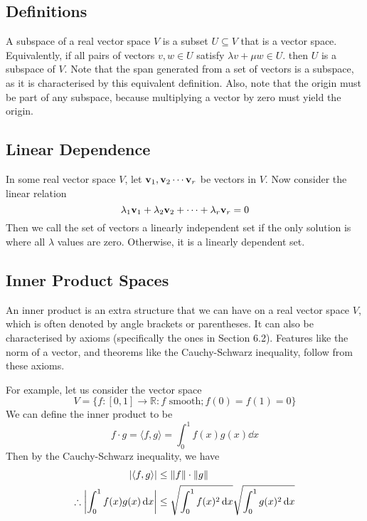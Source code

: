 \subsection{Definitions}
A subspace of a real vector space $V$ is a subset $U \subseteq V$ that is a vector space. Equivalently, if all pairs of vectors $v, w \in U$ satisfy $\lambda v + \mu w \in U$. then $U$ is a subspace of $V$. Note that the span generated from a set of vectors is a subspace, as it is characterised by this equivalent definition. Also, note that the origin must be part of any subspace, because multiplying a vector by zero must yield the origin.

\subsection{Linear Dependence}
In some real vector space $V$, let $\vb v_1, \vb v_2 \cdots \vb v_r$ be vectors in $V$. Now consider the linear relation
\[ \lambda_1 \vb v_1 + \lambda_2 \vb v_2 + \cdots + \lambda_r \vb v_r = 0 \]
Then we call the set of vectors a linearly independent set if the only solution is where all $\lambda$ values are zero. Otherwise, it is a linearly dependent set.

\subsection{Inner Product Spaces}
An inner product is an extra structure that we can have on a real vector space $V$, which is often denoted by angle brackets or parentheses. It can also be characterised by axioms (specifically the ones in Section 6.2). Features like the norm of a vector, and theorems like the Cauchy-Schwarz inequality, follow from these axioms.

For example, let us consider the vector space
\[ V = \{ f: [0, 1] \to \mathbb R: f \text{ smooth}; f(0) = f(1) = 0 \} \]
We can define the inner product to be
\[ f \cdot g = \langle f, g \rangle = \int_0^1 f(x)g(x)\dd{x} \]
Then by the Cauchy-Schwarz inequality, we have
\begin{align*}
	\abs{\langle f, g \rangle}               & \leq \norm{f} \cdot \norm{g}                                    \\
	\therefore \abs{\int_0^1 f(x)g(x)\dd{x}} & \leq \sqrt{\int_0^1 f(x)^2 \dd{x}}\sqrt{\int_0^1 g(x)^2 \dd{x}}
\end{align*}

